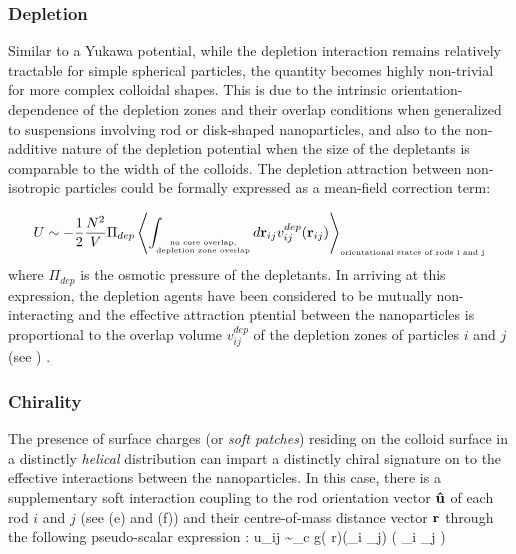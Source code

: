 \subsubsection{Depletion}

Similar to a Yukawa potential, while the depletion interaction remains relatively tractable for simple spherical particles, the quantity becomes highly non-trivial for more complex colloidal shapes. This is due to the intrinsic orientation-dependence of the depletion zones and their overlap conditions when generalized to suspensions involving rod or disk-shaped nanoparticles, and also to the non-additive nature of the depletion potential when the size of the depletants is comparable to the width of the colloids. The depletion attraction between non-isotropic particles could be formally expressed as a mean-field correction term:


 \begin{equation}
U \sim  -\frac{1}{2} \frac{N^{2}}{V} \Pi_{dep} \left \langle \int_{
\substack{
\mbox{\tiny no core overlap,} \\
\mbox{\tiny depletion zone overlap}
}
} d {\bf r}_{ij}   v^{dep}_{ij}({\bf r}_{ij})  \right \rangle_{\mbox{\tiny orientational states of rods i and j}}
\label{degen}
\end{equation}
where $\Pi_{dep}$ is the osmotic pressure of the depletants. In arriving at this expression, the depletion agents have been considered to be mutually non-interacting and the effective attraction ptential between the nanoparticles is proportional to the overlap volume $v^{dep}_{ij}$ of the depletion zones of particles $i$ and $j$ (see ) \cite{LekkerkerkerTuinier2011}.

\subsubsection{Chirality}

The presence of surface charges (or {\em soft patches}) residing on the colloid surface in a distinctly {\em helical} distribution can impart a distinctly chiral signature on to the effective interactions between the nanoparticles. In this case, there is a supplementary soft interaction coupling to the rod orientation vector ${\bf \hat{u}}$ of each rod $i$ and $j$ (see  (e) and (f)) and their centre-of-mass distance vector $\bf r$ through the following pseudo-scalar expression \cite{goossens1971}:
\beq
u_{ij} \sim  \varepsilon_{c} g( r)({\bf {}}_{i} _{j}) ( {\bf {}}_{i} _{j}  )
\label{chirality}
\eeq

